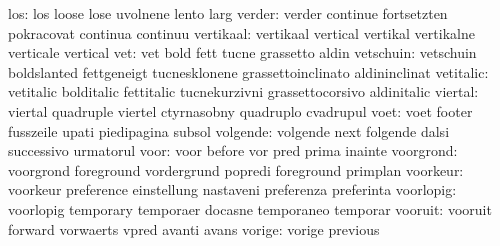                      los: los                       loose
                           lose                      uvolnene
                           lento                     larg
                   verder: verder                    continue
                           fortsetzten               pokracovat
                           continua                  continuu
                vertikaal: vertikaal                 vertical
                           vertikal                  vertikalne
                           verticale                 vertical
                      vet: vet                       bold
                           fett                      tucne
                           grassetto                 aldin
                vetschuin: vetschuin                 boldslanted
                           fettgeneigt               tucnesklonene
                           grassettoinclinato        aldininclinat
                vetitalic: vetitalic                 bolditalic
                           fettitalic                tucnekurzivni
                           grassettocorsivo          aldinitalic
                  viertal: viertal                   quadruple
                           viertel                   ctyrnasobny
                           quadruplo                 cvadrupul
                     voet: voet                      footer
                           fusszeile                 upati
                           piedipagina               subsol
                 volgende: volgende                  next
                           folgende                  dalsi
                           successivo                urmatorul
                     voor: voor                      before
                           vor                       pred
                           prima                     inainte
                voorgrond: voorgrond                 foreground
                           vordergrund               popredi
                           foreground                primplan
                 voorkeur: voorkeur                  preference
                           einstellung               nastaveni
                           preferenza                preferinta
                voorlopig: voorlopig                 temporary
                           temporaer                 docasne
                           temporaneo                temporar
                  vooruit: vooruit                   forward
                           vorwaerts                 vpred
                           avanti                    avans
                   vorige: vorige                    previous
